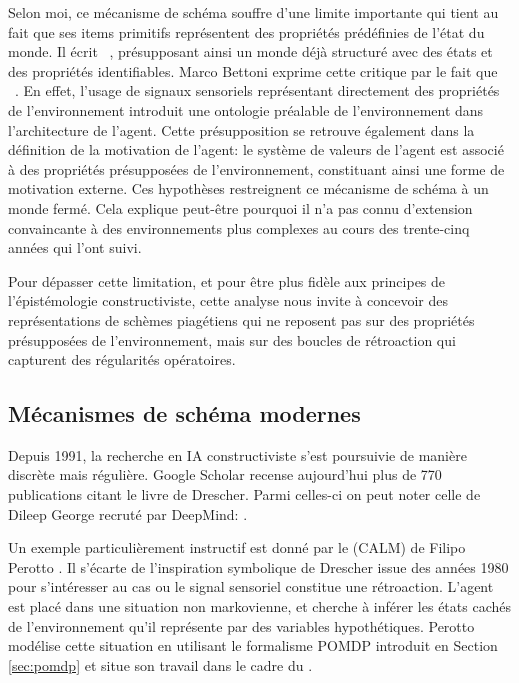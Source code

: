 Selon moi, ce mécanisme de schéma souffre d'une limite importante qui tient au fait que ses items primitifs représentent des propriétés prédéfinies de l'état du monde. 
Il écrit \og {} \fg\ \cite[p.~5]{drescher_made-up_1991}, présupposant ainsi un monde déjà structuré avec des états et des propriétés identifiables.
Marco Bettoni exprime cette critique par le fait que \og {} \fg\ \cite[p.~6]{bettoni_made-up_1993}. 
En effet, l'usage de signaux sensoriels représentant directement des propriétés de l'environnement introduit une ontologie préalable de l'environnement dans l'architecture de l'agent.
Cette présupposition se retrouve également dans la définition de la motivation de l'agent: le système de valeurs de l'agent est associé à des propriétés présupposées de l'environnement, constituant ainsi une forme de motivation externe. 
Ces hypothèses restreignent ce mécanisme de schéma à un monde fermé.
Cela explique peut-être pourquoi il n'a pas connu d'extension convaincante à des environnements plus complexes au cours des trente-cinq années qui l'ont suivi. 

Pour dépasser cette limitation, et pour être plus fidèle aux principes de l'épistémologie constructiviste, cette analyse nous invite à concevoir des représentations de schèmes piagétiens qui ne reposent pas sur des propriétés présupposées de l'environnement, mais sur des boucles de rétroaction qui capturent des régularités opératoires.

\subsection{Mécanismes de schéma modernes}
\label{sec:perotto}

\noindent
Depuis 1991, la recherche en IA constructiviste s'est poursuivie de manière discrète mais régulière.
Google Scholar recense aujourd'hui plus de 770 publications citant le livre de Drescher.
Parmi celles-ci on peut noter celle de Dileep George recruté par DeepMind:   \cite{hay_behavior_2018}.

Un exemple particulièrement instructif est donné par le  (CALM) de Filipo Perotto \cite{perotto_computational_2013}. 
Il s'écarte de l'inspiration symbolique de Drescher issue des années 1980 pour s'intéresser au cas ou le signal sensoriel constitue une rétroaction.
L'agent est placé dans une situation non markovienne, et cherche à inférer les états cachés de l'environnement qu'il représente par des variables hypothétiques. 
Perotto modélise cette situation en utilisant le formalisme POMDP introduit en Section \ref{sec:pomdp} et situe son travail dans le cadre du .

